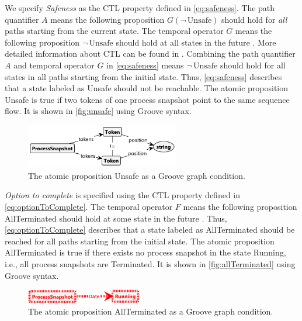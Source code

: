 \documentclass{lmcs} %
\begin{document}
We specify \textit{Safeness} as the CTL property defined in \eqref{eq:safeness}.
The path quantifier $A$ means the following proposition $G(\neg \,\text{Unsafe})$ should hold for \textit{all} paths starting from the current state.
The temporal operator $G$ means the following proposition $\neg \,\text{Unsafe}$ should hold at all states in the future \cite{clarkeHandbookModelChecking2018}.
More detailed information about CTL can be found in \cite{clarkeHandbookModelChecking2018, baierPrinciplesModelChecking2008}.
Combining the path quantifier $A$ and temporal operator $G$ in \eqref{eq:safeness} means $\neg \,\text{Unsafe}$ should hold for all states in all paths starting from the initial state.
Thus, \eqref{eq:safeness} describes that a state labeled as \textsf{Unsafe} should not be reachable.
The atomic proposition \textsf{Unsafe} is true if two tokens of one process snapshot point to the same sequence flow.
It is shown in \autoref{fig:unsafe} using Groove syntax.

\begin{figure}[ht]
    \centering
    \includegraphics[width=0.6\textwidth]{images/Unsafe.pdf}
    \caption{The atomic proposition \textsf{Unsafe} as a Groove graph condition.}
    \label{fig:unsafe}
\end{figure}

\textit{Option to complete} is specified using the CTL property defined in \eqref{eq:optionToComplete}.
The temporal operator $F$ means the following proposition \textsf{AllTerminated} should hold at some state in the future \cite{clarkeHandbookModelChecking2018}.
Thus, \eqref{eq:optionToComplete} describes that a state labeled as \textsf{AllTerminated} should be reached for all paths starting from the initial state.
The atomic proposition \textsf{AllTerminated} is true if there exists no process snapshot in the state \textsf{Running}, i.e., all process snapshots are \textsf{Terminated}.
It is shown in \autoref{fig:allTerminated} using Groove syntax.

\begin{figure}[ht]
    \centering
    \includegraphics[width=0.45\textwidth]{images/AllTerminated.pdf}
    \caption{The atomic proposition \textsf{AllTerminated} as a Groove graph condition.}
    \label{fig:allTerminated}
\end{figure}
\end{document}
